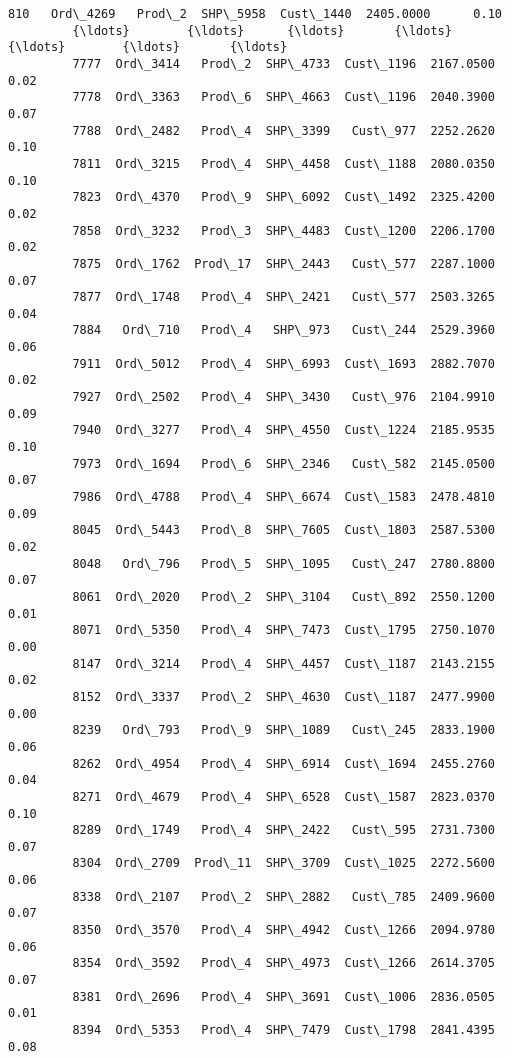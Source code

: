 \documentclass[11pt]{article}
\begin{document}
\begin{Verbatim}[commandchars=\\\{\}]
         810   Ord\_4269   Prod\_2  SHP\_5958  Cust\_1440  2405.0000      0.10   
         {\ldots}        {\ldots}      {\ldots}       {\ldots}        {\ldots}        {\ldots}       {\ldots}   
         7777  Ord\_3414   Prod\_2  SHP\_4733  Cust\_1196  2167.0500      0.02   
         7778  Ord\_3363   Prod\_6  SHP\_4663  Cust\_1196  2040.3900      0.07   
         7788  Ord\_2482   Prod\_4  SHP\_3399   Cust\_977  2252.2620      0.10   
         7811  Ord\_3215   Prod\_4  SHP\_4458  Cust\_1188  2080.0350      0.10   
         7823  Ord\_4370   Prod\_9  SHP\_6092  Cust\_1492  2325.4200      0.02   
         7858  Ord\_3232   Prod\_3  SHP\_4483  Cust\_1200  2206.1700      0.02   
         7875  Ord\_1762  Prod\_17  SHP\_2443   Cust\_577  2287.1000      0.07   
         7877  Ord\_1748   Prod\_4  SHP\_2421   Cust\_577  2503.3265      0.04   
         7884   Ord\_710   Prod\_4   SHP\_973   Cust\_244  2529.3960      0.06   
         7911  Ord\_5012   Prod\_4  SHP\_6993  Cust\_1693  2882.7070      0.02   
         7927  Ord\_2502   Prod\_4  SHP\_3430   Cust\_976  2104.9910      0.09   
         7940  Ord\_3277   Prod\_4  SHP\_4550  Cust\_1224  2185.9535      0.10   
         7973  Ord\_1694   Prod\_6  SHP\_2346   Cust\_582  2145.0500      0.07   
         7986  Ord\_4788   Prod\_4  SHP\_6674  Cust\_1583  2478.4810      0.09   
         8045  Ord\_5443   Prod\_8  SHP\_7605  Cust\_1803  2587.5300      0.02   
         8048   Ord\_796   Prod\_5  SHP\_1095   Cust\_247  2780.8800      0.07   
         8061  Ord\_2020   Prod\_2  SHP\_3104   Cust\_892  2550.1200      0.01   
         8071  Ord\_5350   Prod\_4  SHP\_7473  Cust\_1795  2750.1070      0.00   
         8147  Ord\_3214   Prod\_4  SHP\_4457  Cust\_1187  2143.2155      0.02   
         8152  Ord\_3337   Prod\_2  SHP\_4630  Cust\_1187  2477.9900      0.00   
         8239   Ord\_793   Prod\_9  SHP\_1089   Cust\_245  2833.1900      0.06   
         8262  Ord\_4954   Prod\_4  SHP\_6914  Cust\_1694  2455.2760      0.04   
         8271  Ord\_4679   Prod\_4  SHP\_6528  Cust\_1587  2823.0370      0.10   
         8289  Ord\_1749   Prod\_4  SHP\_2422   Cust\_595  2731.7300      0.07   
         8304  Ord\_2709  Prod\_11  SHP\_3709  Cust\_1025  2272.5600      0.06   
         8338  Ord\_2107   Prod\_2  SHP\_2882   Cust\_785  2409.9600      0.07   
         8350  Ord\_3570   Prod\_4  SHP\_4942  Cust\_1266  2094.9780      0.06   
         8354  Ord\_3592   Prod\_4  SHP\_4973  Cust\_1266  2614.3705      0.07   
         8381  Ord\_2696   Prod\_4  SHP\_3691  Cust\_1006  2836.0505      0.01   
         8394  Ord\_5353   Prod\_4  SHP\_7479  Cust\_1798  2841.4395      0.08   
         

\end{Verbatim}
\end{document}
